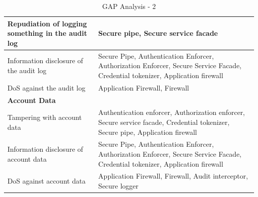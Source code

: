 \documentclass[a4paper,11pt]{report}
\begin{document}
\begin{table}[htpb]
\begin{center}
\begin{tabular}{| p{5cm} | p{} |}
Repudiation of logging something in the audit log & Secure pipe, Secure service facade \\\hline
Information disclosure of the audit log & Secure Pipe, Authentication Enforcer, Authorization Enforcer, Secure Service Facade, Credential tokenizer, Application firewall \\\hline
DoS against the audit log & Application Firewall, Firewall \\\hline
\textbf{Account Data} & \\\hline
Tampering with account data & Authentication enforcer, Authorization enforcer, Secure service facade, Credential tokenizer, Secure pipe, Application firewall \\\hline
Information disclosure of account data & Secure Pipe, Authentication Enforcer, Authorization Enforcer, Secure Service Facade, Credential tokenizer, Application firewall \\\hline
DoS against account data & Application Firewall, Firewall, Audit interceptor, Secure logger\\\hline
\end{tabular}
\end{center}
\caption{GAP Analysis - 2}
\label{table:gap2}
\end{table}
\end{document}
